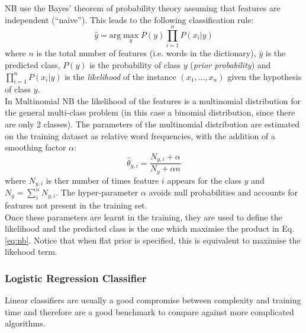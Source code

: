 \documentclass[a4paper,12pt]{article} %
\begin{document}
NB use the Bayes' theorem of probability theory assuming that features are independent (``naive'').
This leads to the following classification rule:
\begin{equation}
    \label{eq:nb}
    \hat{y} = \mathrm{arg} \max_{y} P(y) \prod_{i=1}^{n} P(x_{i} | y)
\end{equation}
where $n$ is the total number of features (i.e. words in the dictionary),
$\hat{y}$ is the predicted class, $P(y)$ is the probability of class $y$ (\textit{prior probability})
and $\prod_{i=1}^{n} P(x_{i} | y)$ is the \textit{likelihood} of the instance $(x_{1}, ..., x_{n})$
given the hypothesis of class $y$. \\
In Multinomial NB the likelihood of the features is a multinomial distribution for the general multi-class problem
(in this case a binomial distribution, since there are only 2 classes).
The parameters of the multinomial distribution are estimated on the training dataset as relative word frequencies,
with the addition of a smoothing factor $\alpha$:
\begin{equation}
    \hat{\theta}_{y,i} = \dfrac{N_{y,i} + \alpha}{N_{y} + \alpha n}
\end{equation}
where $N_{y,i}$ is ther number of times feature $i$ appears for the class $y$ and
$N_{y} = \sum _{i}^{n}N_{y,i}$.
The hyper-parameter $\alpha$ avoids null probabilities and accounts for
features not present in the training set. \\
Once these parameters are learnt in the training, they are used to define the likelihood
and the predicted class is the one which maximise the product in Eq. \ref{eq:nb}.
Notice that when flat prior is specified, this is equivalent to maximise the likehood term.

\subsubsection*{Logistic Regression Classifier}
Linear classifiers are usually a good compromise between
complexity and training time and therefore are a good benchmark to compare against more complicated algorithms.
\end{document}
